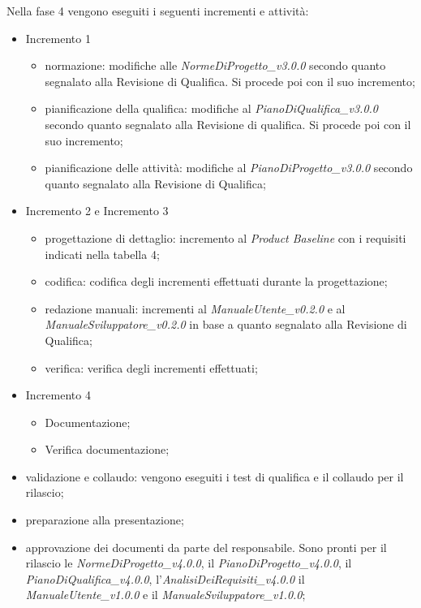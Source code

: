 Nella fase 4 vengono eseguiti i seguenti incrementi e attività:
\begin{itemize}
	\item Incremento 1
			\begin{itemize}
				\item normazione: modifiche alle \textit{NormeDiProgetto\_v3.0.0} secondo quanto segnalato alla Revisione di Qualifica. Si procede poi con il suo incremento;
				\item pianificazione della qualifica: modifiche al \textit{PianoDiQualifica\_v3.0.0} secondo quanto segnalato alla Revisione di qualifica. Si procede poi con il suo incremento;
				\item pianificazione delle attività: modifiche al \textit{PianoDiProgetto\_v3.0.0} secondo quanto segnalato alla Revisione di Qualifica;
			\end{itemize}
	\item Incremento 2 e Incremento 3
		\begin{itemize}
			\item progettazione di dettaglio: incremento al \textit{Product Baseline} con i requisiti indicati nella tabella 4;
			\item codifica: codifica degli incrementi effettuati durante la progettazione;
			\item redazione manuali: incrementi al \textit{ManualeUtente\_v0.2.0} e al \textit{ManualeSviluppatore\_v0.2.0} in base a quanto segnalato alla Revisione di Qualifica;
			\item verifica: verifica degli incrementi effettuati;
		\end{itemize}
	\item Incremento 4
		\begin{itemize}
			\item Documentazione;
			\item Verifica documentazione;
		\end{itemize}
	\item validazione e collaudo: vengono eseguiti i test di qualifica e il collaudo per il rilascio;
	\item preparazione alla presentazione;
	\item approvazione dei documenti da parte del responsabile. Sono pronti per il rilascio le \textit{NormeDiProgetto\_v4.0.0}, il \textit{PianoDiProgetto\_v4.0.0}, il \textit{PianoDiQualifica\_v4.0.0}, l'\textit{AnalisiDeiRequisiti\_v4.0.0} il
	\textit{ManualeUtente\_v1.0.0} e il \textit{ManualeSviluppatore\_v1.0.0};
\end{itemize}

